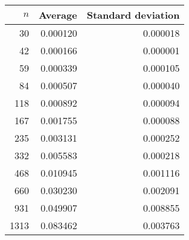 \begin{tabular}{rrr}
$n$ & Average & Standard deviation\\\hline
30 & 0.000120 & 0.000018\\
42 & 0.000166 & 0.000001\\
59 & 0.000339 & 0.000105\\
84 & 0.000507 & 0.000040\\
118 & 0.000892 & 0.000094\\
167 & 0.001755 & 0.000088\\
235 & 0.003131 & 0.000252\\
332 & 0.005583 & 0.000218\\
468 & 0.010945 & 0.001116\\
660 & 0.030230 & 0.002091\\
931 & 0.049907 & 0.008855\\
1313 & 0.083462 & 0.003763\\
\end{tabular}
